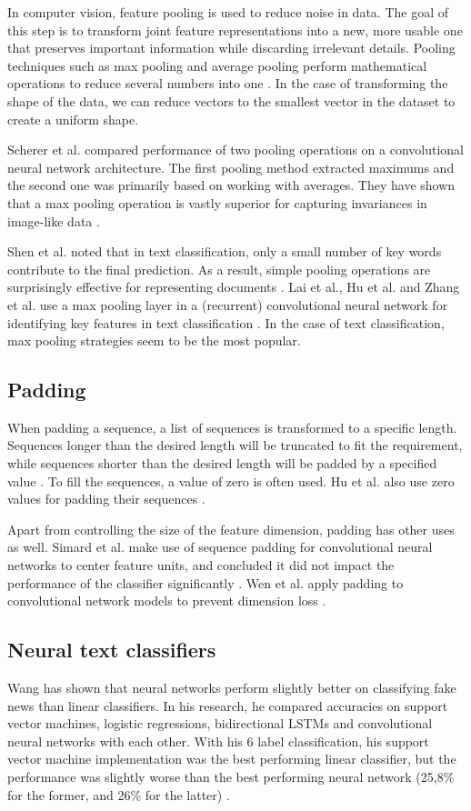 In computer vision, feature pooling is used to reduce noise in data. 
The goal of this step is to transform joint feature representations into a new, more usable one that preserves important information while discarding irrelevant details. 
Pooling techniques such as max pooling and average pooling perform mathematical operations to reduce several numbers into one \cite{boureau2010}. 
In the case of transforming the shape of the data, we can reduce vectors to the smallest vector in the dataset to create a uniform shape.

Scherer et al. compared performance of two pooling operations on a convolutional neural network architecture. 
The first pooling method extracted maximums and the second one was primarily based on working with averages.
They have shown that a max pooling operation is vastly superior for capturing invariances in image-like data \cite{scherer2010}.

Shen et al. noted that in text classification, only a small number of key words contribute to the final prediction.
As a result, simple pooling operations are surprisingly effective for representing documents \cite{shen2018}.  
Lai et al., Hu et al. and Zhang et al. use a max pooling layer in a (recurrent) convolutional neural network for identifying key features in text classification \cite{lai2015}\cite{hu2014}\cite{zhang2015}. 
In the case of text classification, max pooling strategies seem to be the most popular. 

\subsection{Padding}
When padding a sequence, a list of sequences is transformed to a specific length. 
Sequences longer than the desired length will be truncated to fit the requirement, while sequences shorter than the desired length will be padded by a specified value \cite{keraspad}. 
To fill the sequences, a value of zero is often used. Hu et al. also use zero values for padding their sequences \cite{hu2014}. 

Apart from controlling the size of the feature dimension, padding has other uses as well. 
Simard et al. make use of sequence padding for convolutional neural networks to center feature units, and concluded it did not impact the performance of the classifier significantly \cite{simard2003}. 
Wen et al. apply padding to convolutional network models to prevent dimension loss \cite{wen2018}. 

\subsection{Neural text classifiers}
Wang has shown that neural networks perform slightly better on classifying fake news than linear classifiers. 
In his research, he compared accuracies on support vector machines, logistic regressions, bidirectional LSTMs and convolutional neural networks with each other.
With his 6 label classification, his support vector machine implementation was the best performing linear classifier, but the performance was slightly worse than the best performing neural network (25,8\% for the former, and 26\% for the latter) \cite{wang2018}.


